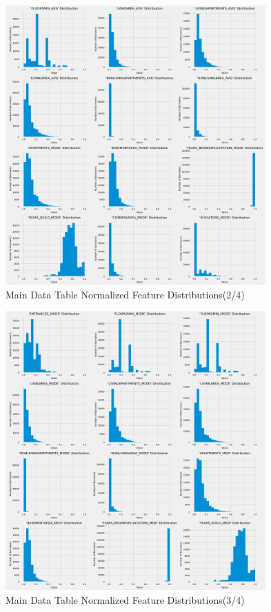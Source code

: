 \documentclass[12pt, letterpaper]{article}
\begin{document}
\begin{appendices}
\pagebreak

\begin{figure}[ht]
\includegraphics[width=0.89\textwidth]{main-data-table-normal-feature-distribs-p2}
\centering
\caption{Main Data Table Normalized Feature Distributions(2/4)}
\end{figure}

\pagebreak

\begin{figure}[ht]
\includegraphics[width=0.89\textwidth]{main-data-table-normal-feature-distribs-p3}
\centering
\caption{Main Data Table Normalized Feature Distributions(3/4)}
\end{figure}


\end{appendices}
\end{document}
